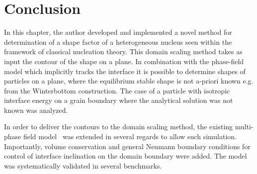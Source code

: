 
\section{Conclusion}
In this chapter, the author developed and implemented a novel method for determination of a shape factor of a heterogeneous nucleus seen within the framework of classical nucleation theory. This domain scaling method takes as input the contour of the shape on a plane. In combination with the phase-field model which implicitly tracks the interface it is possible to determine shapes of particles on a plane, where the equilibrium stable shape is not a-priori known e.g. from the Winterbottom construction. The case of a particle with isotropic interface energy on a grain boundary where the analytical solution was not known was analyzed. 

In order to deliver the contours to the domain scaling method, the existing multi-phase field model~\cite{Moelans2008, Minar2022} was extended in several regards to allow such simulation. Importantly, volume conservation and general Neumann boundary conditions for control of interface inclination on the domain boundary were added. The model was systematically validated in several benchmarks.

